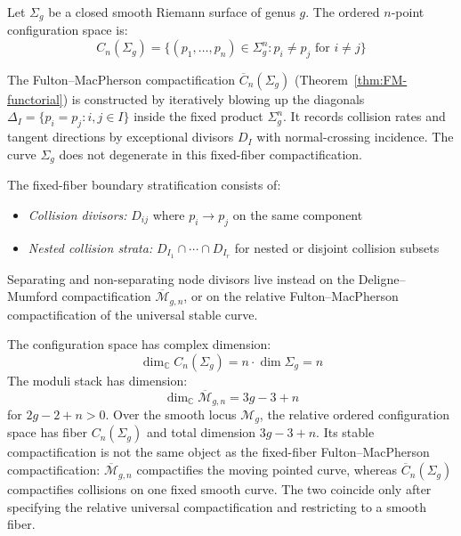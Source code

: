 \begin{definition}
\label{def:higher-genus-config-space}
Let $\Sigma_g$ be a closed smooth Riemann surface of genus $g$. The
ordered $n$-point configuration space is:
\begin{equation}
C_n(\Sigma_g) = \{(p_1, \ldots, p_n) \in \Sigma_g^n : p_i \neq p_j \text{ for } i \neq j\}
\end{equation}

The Fulton--MacPherson compactification
$\overline{C}_n(\Sigma_g)$
\textup{(}Theorem~\textup{\ref{thm:FM-functorial}}\textup{)}
is constructed by iteratively blowing up the diagonals
$\Delta_I=\{p_i=p_j:i,j\in I\}$ inside the fixed product
$\Sigma_g^n$. It records collision rates and tangent directions by
exceptional divisors $D_I$ with normal-crossing incidence. The curve
$\Sigma_g$ does not degenerate in this fixed-fiber compactification.

The fixed-fiber boundary stratification consists of:
\begin{itemize}
\item \emph{Collision divisors:} $D_{ij}$ where $p_i \to p_j$ on the same component
\item \emph{Nested collision strata:} $D_{I_1}\cap\cdots\cap D_{I_r}$ for nested or disjoint collision subsets
\end{itemize}
Separating and non-separating node divisors live instead on the
Deligne--Mumford compactification
$\overline{\mathcal M}_{g,n}$, or on the relative
Fulton--MacPherson compactification of the universal stable curve.
\end{definition}

\begin{remark}
\label{rem:dimension-higher-genus}
The configuration space has complex dimension:
\begin{equation}
\dim_{\mathbb{C}} C_n(\Sigma_g) = n \cdot \dim \Sigma_g = n
\end{equation}
The moduli stack has dimension:
\begin{equation}
\dim_{\mathbb{C}} \overline{\mathcal{M}}_{g,n} = 3g - 3 + n
\end{equation}
for $2g-2+n>0$. Over the smooth locus $\mathcal M_g$, the relative
ordered configuration space has fiber $C_n(\Sigma_g)$ and total
dimension $3g-3+n$. Its stable compactification is not the same
object as the fixed-fiber Fulton--MacPherson compactification:
$\overline{\mathcal M}_{g,n}$ compactifies the moving pointed curve,
whereas $\overline C_n(\Sigma_g)$ compactifies collisions on one
fixed smooth curve. The two coincide only after specifying the
relative universal compactification and restricting to a smooth
fiber.
\end{remark}

